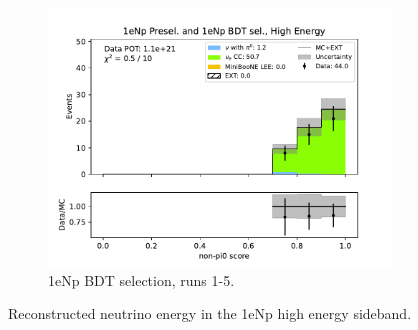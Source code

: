 \begin{figure}[H]
\begin{subfigure}{0.33\linewidth}
    \includegraphics[width=\linewidth]{technote/Sidebands/Figures/FarSideband/far_sideband_nonpi0_score_run1234b4c4d5_NP_NPBDT_HIGH_ENERGY.pdf}
    \caption{1eNp BDT selection, runs 1-5.}
    \end{subfigure}
    \caption{Reconstructed neutrino energy in the 1eNp high energy sideband.}
    \label{fig:HighEnergy1eNp_nonpi0_score}
\end{figure}

